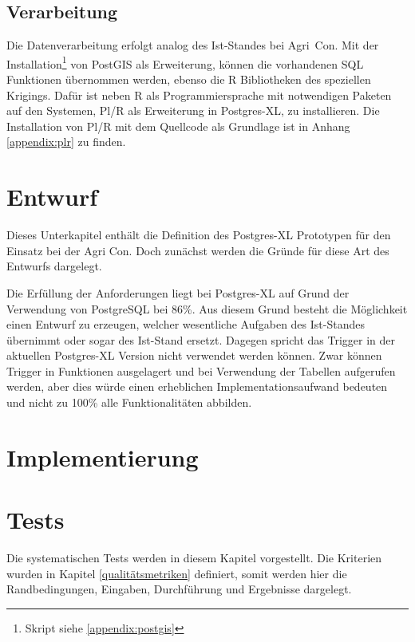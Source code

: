\subsection{Verarbeitung}
Die Datenverarbeitung erfolgt analog des Ist-Standes bei Agri~Con.
Mit der Installation\footnote{Skript siehe \ref{appendix:postgis}} von PostGIS als Erweiterung, können die vorhandenen SQL Funktionen übernommen werden, ebenso die R Bibliotheken des speziellen Krigings.
Dafür ist neben R als Programmiersprache mit notwendigen Paketen auf den Systemen, Pl/R als Erweiterung in Postgres-XL, zu installieren.
Die Installation von Pl/R mit dem Quellcode als Grundlage ist in Anhang \ref{appendix:plr} zu finden.


\section{Entwurf}
Dieses Unterkapitel enthält die Definition des Postgres-XL Prototypen für den Einsatz bei der Agri Con.
Doch zunächst werden die Gründe für diese Art des Entwurfs dargelegt.

Die Erfüllung der Anforderungen liegt bei Postgres-XL auf Grund der Verwendung von PostgreSQL bei 86\%{}.
Aus diesem Grund besteht die Möglichkeit einen Entwurf zu erzeugen, welcher wesentliche Aufgaben des Ist-Standes übernimmt oder sogar des Ist-Stand ersetzt.
Dagegen spricht das Trigger in der aktuellen Postgres-XL Version nicht verwendet werden können.
Zwar können Trigger in Funktionen ausgelagert und bei Verwendung der Tabellen aufgerufen werden, aber dies würde einen erheblichen Implementationsaufwand bedeuten und nicht zu 100\%{} alle Funktionalitäten abbilden.


\section{Implementierung}

\section{Tests}
Die systematischen Tests werden in diesem Kapitel vorgestellt.
Die Kriterien wurden in Kapitel \ref{qualitätsmetriken} definiert, somit werden hier die Randbedingungen, Eingaben, Durchführung und Ergebnisse dargelegt.


